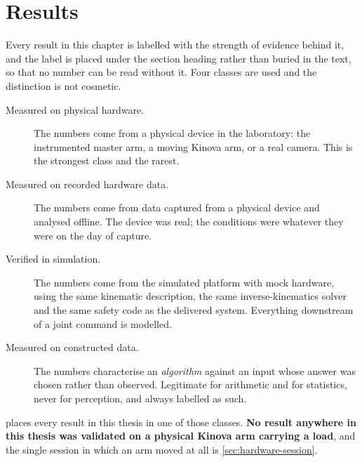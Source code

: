 \chapter{Results}
\label{ch:results}

Every result in this chapter is labelled with the strength of evidence behind
it, and the label is placed under the section heading rather than buried in
the text, so that no number can be read without it. Four classes are used and
the distinction is not cosmetic.

\begin{description}
  \item[Measured on physical hardware.] The numbers come from a physical
    device in the laboratory: the instrumented master arm, a moving Kinova
    arm, or a real camera. This is the strongest class and the rarest.
  \item[Measured on recorded hardware data.] The numbers come from data
    captured from a physical device and analysed offline. The device was
    real; the conditions were whatever they were on the day of capture.
  \item[Verified in simulation.] The numbers come from the simulated platform
    with mock hardware, using the same kinematic description, the same
    inverse-kinematics solver and the same safety code as the delivered
    system. Everything downstream of a joint command is modelled.
  \item[Measured on constructed data.] The numbers characterise an
    \emph{algorithm} against an input whose answer was chosen rather than
    observed. Legitimate for arithmetic and for statistics, never for
    perception, and always labelled as such.
\end{description}

 places every result in this thesis in one of those
classes. \textbf{No result anywhere in this thesis was validated on a physical
Kinova arm carrying a load}, and the single session in which an arm moved at
all is \cref{sec:hardware-session}.

